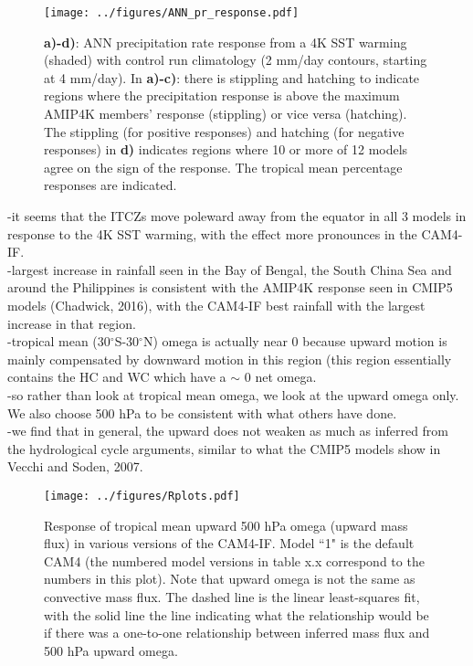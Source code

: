 \documentclass[letterpaper,12pt,titlepage,oneside,final]{book}
\begin{document}
\begin{figure}[H]
\centering
\noindent\texttt{[image: ../figures/ANN\_pr\_response.pdf]}\hfill
\caption{\textbf{a)-d)}: ANN precipitation rate response from a 4K SST warming (shaded) with control run climatology (2 mm/day contours, starting at 4 mm/day). In \textbf{a)-c)}: there is stippling and hatching to indicate regions where the precipitation response is above the maximum AMIP4K members' response (stippling) or vice versa (hatching). The stippling (for positive responses) and hatching (for negative responses) in \textbf{d)} indicates regions where 10 or more of 12 models agree on the sign of the response. The tropical mean percentage responses are indicated.}
\end{figure}
-it seems that the ITCZs move poleward away from the equator in all 3 models in response to the 4K SST warming, with the effect more pronounces in the CAM4-IF.
\\
-largest increase in rainfall seen in the Bay of Bengal, the South China Sea and around the Philippines is consistent with the AMIP4K response seen in CMIP5 models (Chadwick, 2016), with the CAM4-IF best rainfall with the largest increase in that region.
\\
-tropical mean (30$^\circ$S-30$^\circ$N) omega is actually near 0 because upward motion is mainly compensated by downward motion in this region (this region essentially contains the HC and WC which have a $\sim$ 0 net omega.
\\
-so rather than look at tropical mean omega, we look at the upward omega only. We also choose 500 hPa to be consistent with what others have done.
\\
-we find that in general, the upward does not weaken as much as inferred from the hydrological cycle arguments, similar to what the CMIP5 models show in Vecchi and Soden, 2007.
\begin{figure}[H]
\centering
\noindent\texttt{[image: ../figures/Rplots.pdf]}\hfill
\caption{Response of tropical mean upward 500 hPa omega (upward mass flux) in various versions of the CAM4-IF. Model ``1" is the default CAM4 (the numbered model versions in table x.x correspond to the numbers in this plot). Note that upward omega is not the same as convective mass flux. The dashed line is the linear least-squares fit, with the solid line the line indicating what the relationship would be if there was a  one-to-one relationship between inferred mass flux and 500 hPa upward omega.}
\end{figure}
\end{document}
